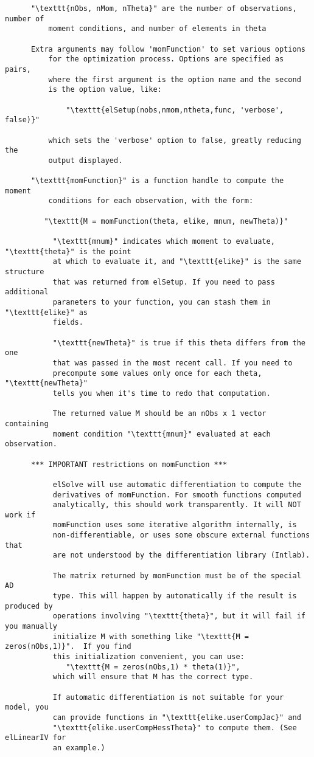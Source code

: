 \begin{lstlisting}
      "\texttt{nObs, nMom, nTheta}" are the number of observations, number of
          moment conditions, and number of elements in theta
 
      Extra arguments may follow 'momFunction' to set various options
          for the optimization process. Options are specified as pairs,
          where the first argument is the option name and the second
          is the option value, like:
 
              "\texttt{elSetup(nobs,nmom,ntheta,func, 'verbose', false)}"
 
          which sets the 'verbose' option to false, greatly reducing the
          output displayed.
 
      "\texttt{momFunction}" is a function handle to compute the moment
          conditions for each observation, with the form:
       
         "\texttt{M = momFunction(theta, elike, mnum, newTheta)}"
 
           "\texttt{mnum}" indicates which moment to evaluate, "\texttt{theta}" is the point
           at which to evaluate it, and "\texttt{elike}" is the same structure
           that was returned from elSetup. If you need to pass additional
           paraneters to your function, you can stash them in "\texttt{elike}" as
           fields.
 
           "\texttt{newTheta}" is true if this theta differs from the one
           that was passed in the most recent call. If you need to
           precompute some values only once for each theta, "\texttt{newTheta}"
           tells you when it's time to redo that computation.
 
           The returned value M should be an nObs x 1 vector containing
           moment condition "\texttt{mnum}" evaluated at each observation.
           
      *** IMPORTANT restrictions on momFunction ***
 
           elSolve will use automatic differentiation to compute the
           derivatives of momFunction. For smooth functions computed
           analytically, this should work transparently. It will NOT work if
           momFunction uses some iterative algorithm internally, is
           non-differentiable, or uses some obscure external functions that
           are not understood by the differentiation library (Intlab).
 
           The matrix returned by momFunction must be of the special AD
           type. This will happen by automatically if the result is produced by
           operations involving "\texttt{theta}", but it will fail if you manually
           initialize M with something like "\texttt{M = zeros(nObs,1)}".  If you find
           this initialization convenient, you can use:
              "\texttt{M = zeros(nObs,1) * theta(1)}",
           which will ensure that M has the correct type.
 
           If automatic differentiation is not suitable for your model, you
           can provide functions in "\texttt{elike.userCompJac}" and
           "\texttt{elike.userCompHessTheta}" to compute them. (See elLinearIV for
           an example.)
 \end{lstlisting}
